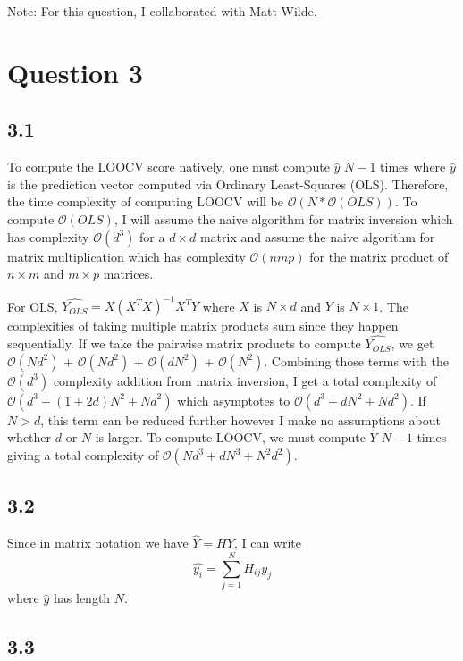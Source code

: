 \documentclass[12pt]{amsart}
\begin{document}
Note: For this question, I collaborated with Matt Wilde.


\section*{Question 3}

\subsection*{3.1}

To compute the LOOCV score natively, one must compute $\hat{y}$ $N-1$ times where $\hat{y}$ is the prediction vector computed via Ordinary Least-Squares (OLS).  Therefore, the time complexity of computing LOOCV will be $\mathcal{O}(N * \mathcal{O}(OLS))$.  To compute $\mathcal{O}(OLS)$, I will assume the naive algorithm for matrix inversion which has complexity $\mathcal{O}(d^3)$ for a $d \times d$ matrix and assume the naive algorithm for matrix multiplication which has complexity $\mathcal{O}(nmp)$ for the matrix product of $n \times m$ and $m \times p$ matrices.

For OLS, $\hat{Y_{OLS}} = X(X^T X)^{-1}X^T Y$ where $X$ is $N \times d$ and $Y$ is $N \times 1$.  The complexities of taking multiple matrix products sum since they happen sequentially.  If we take the pairwise matrix products to compute $\hat{Y_{OLS}}$, we get $\mathcal{O}(Nd^2)$ + $\mathcal{O}(Nd^2)$ + $\mathcal{O}(dN^2)$ + $\mathcal{O}(N^2)$.  Combining those terms with the $\mathcal{O}(d^3)$ complexity addition from matrix inversion, I get a total complexity of $\mathcal{O}(d^3 + (1+2d)N^2 + Nd^2)$ which asymptotes to $\mathcal{O}(d^3 + dN^2 + Nd^2)$.  If $N > d$, this term can be reduced further however I make no assumptions about whether $d$ or $N$ is larger.  To compute LOOCV, we must compute $\hat{Y}$ $N - 1$ times giving a total complexity of $\mathcal{O}(Nd^3 + dN^3 + N^2d^2)$.

\subsection*{3.2}

Since in matrix notation we have $\hat{Y} = HY$, I can write 
\begin{equation}
\hat{y_i} = \sum_{j=1}^N H_{ij}y_j
\end{equation}
where $\hat{y}$ has length $N$.

\subsection*{3.3}
\end{document}
